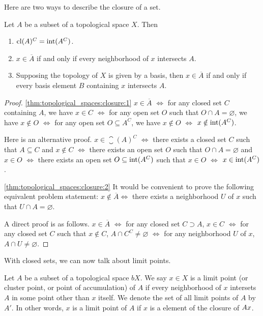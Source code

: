 Here are two ways to describe the closure of a set. 
\begin{thm}
\label{thm:topological_spaces:closure}
Let $A$ be a subset of a topological space $X$. Then 
\begin{enumerate}
    \item \label{thm:topological_spaces:closure:1}
    $\operatorname{cl}(A)^C = \operatorname{int}(A^C)$. 
    \item \label{thm:topological_spaces:closure:2}
    $x \in \overline{A}$ if and only if every neighborhood of $x$ 
    intersects $A$. 
    \item \label{thm:topological_spaces:closure:3}
    Supposing the topology of $X$ is given by a basis, then $x \in 
    \overline{A}$ if and only if every basis element $B$ containing $x$ 
    intersects $A$. 
\end{enumerate} 
\end{thm}
\begin{proof}
\ref{thm:topological_spaces:closure:1} 
$x \in \overline{A}$ 
$\Leftrightarrow$ 
for any closed set $C$ containing $A$, we have $x \in C$ 
$\Leftrightarrow$ 
for any open set $O$ such that $O \cap A = \varnothing$, we have $x \notin O$ 
$\Leftrightarrow$ 
for any open set $O \subseteq A^C$, we have $x \notin O$ 
$\Leftrightarrow$
$x \notin \operatorname{int}(A^C)$. 

Here is an alternative proof. 
$x \in \closure(A)^C$ 
$\Leftrightarrow$ 
there exists a closed set $C$ such that $A \subseteq C$ and $x \notin C$ 
$\Leftrightarrow$ 
there exists an open set $O$ such that $O \cap A = \varnothing$ and $x \in O$ 
$\Leftrightarrow$ 
there exists an open set $O \subseteq \operatorname{int}(A^C)$ such that 
$x \in O$ 
$\Leftrightarrow$ 
$x \in \operatorname{int}(A^C)$.

\ref{thm:topological_spaces:closure:2} 
It would be convenient to prove the following equivalent problem statement:
$x \notin \overline{A} \Leftrightarrow$ there exists a neighborhood $U$ of $x$ 
such that $U \cap A = \varnothing$. 

A direct proof is as follows. 
$x \in \overline{A}$
$\Leftrightarrow$ 
for any closed set $C \supset A$, $x \in C$ 
$\Leftrightarrow$ 
for any closed set $C$ such that $x \notin C$, $A \cap C^C \neq \varnothing$ 
$\Leftrightarrow$ 
for any neighborhood $U$ of $x$, $A \cap U \neq \varnothing$. 
\end{proof}

With closed sets, we can now talk about limit points. 
\begin{defn}
Let $A$ be a subset of a topological space $bX$. 
We say $x \in X$ is a limit point (or cluster point, or point of 
accumulation) of $A$ if every neighborhood of $x$ intersets $A$ in some 
point other than $x$ itself. 
We denote the set of all limit points of $A$ by $A'$. 
In other words, $x$ is a limit point of $A$ if $x$ is a element of the 
closure of $A\\{x}$. 
\end{defn}

